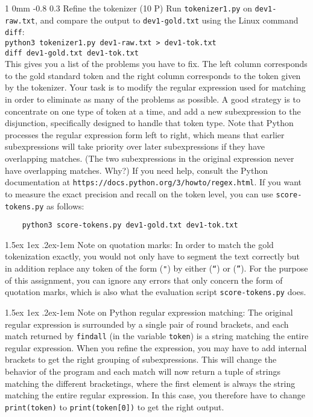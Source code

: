 \documentclass[11pt]{article}
\makeatletter
\newcommand{\newsec}[2]{\section{#1}\label{sec:#2}\noindent}
\renewcommand{\section}{\@startsection
{section}%
{1}%
{0mm}%
{-0.8\baselineskip}%
{0.3\baselineskip}%
{\bfseries\large}}%
\renewcommand{\paragraph}{%
  \@startsection{paragraph}{4}%
  {\z@}{1.5ex \@plus 1ex \@minus .2ex}{-1em}%
  {\normalfont\normalsize\bfseries}%
}\makeatother
\makeatother
\begin{document}
\newsec{Refine the tokenizer (10 P)}{refine}%
Run {\tt tokenizer1.py} on {\tt dev1-raw.txt}, and compare the output
to {\tt dev1-gold.txt} using the Linux command {\tt diff}: \\

\noindent
{\tt python3 tokenizer1.py dev1-raw.txt > dev1-tok.txt}\\

\noindent
{\tt diff dev1-gold.txt dev1-tok.txt}\\

\clearpage
\noindent
This gives you a list of the problems you have to fix. The left column
corresponds to the gold standard token and the right column
corresponds to the token given by the tokenizer. Your task is to
modify the regular expression used for matching in order to eliminate
as many of the problems as possible. A good strategy is to concentrate
on one type of token at a time, and add a new subexpression to the
disjunction, specifically designed to handle that token type. Note
that Python processes the regular expression form left to right, which
means that earlier subexpressions will take priority over later
subexpressions if they have overlapping matches. (The two
subexpressions in the original expression never have overlapping
matches. Why?) If you need help, consult the Python documentation at
{\tt https://docs.python.org/3/howto/regex.html}. If you want to
measure the exact precision and recall on the token level, you can use
{\tt score-tokens.py} as follows:
\begin{verbatim}
    python3 score-tokens.py dev1-gold.txt dev1-tok.txt
\end{verbatim}


\paragraph{Note on quotation marks:} In order to match the gold
tokenization exactly, you would not only have to segment the text
correctly but in addition replace any token of the form ({\tt "}) by
either ({\tt ``}) or ({\tt ''}). For the purpose of this assignment,
you can ignore any errors that only concern the form of quotation
marks, which is also what the evaluation script {\tt score-tokens.py}
does.

\paragraph{Note on Python regular expression matching:} The original
regular expression is surrounded by a single pair of round brackets,
and each match returned by {\tt findall} (in the variable {\tt token})
is a string matching the entire regular expression. When you refine
the expression, you may have to add internal brackets to get the right
grouping of subexpressions. This will change the behavior of the
program and each match will now return a tuple of strings matching the
different bracketings, where the first element is always the string
matching the entire regular expression. In this case, you therefore
have to change {\tt print(token)} to {\tt print(token[0])} to get the
right output.
 
\end{document}
